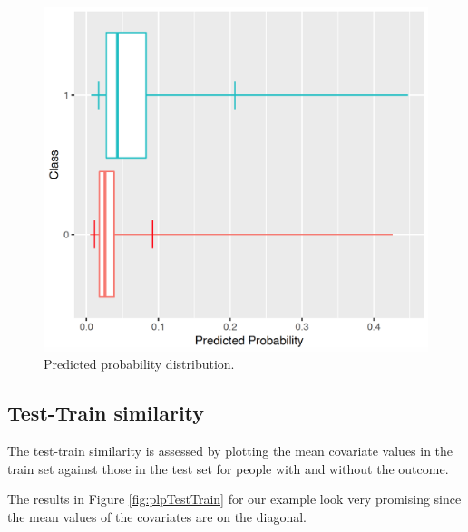\documentclass[11pt]{book}
\begin{document}
\begin{figure}

{\centering \includegraphics[width=0.9\linewidth]{images/PatientLevelPrediction/predictionDistribution} 

}

\caption{Predicted probability distribution.}\label{fig:plpPredProb}
\end{figure}

\subsection{Test-Train similarity}\label{test-train-similarity}

The test-train similarity is assessed by plotting the mean covariate
values in the train set against those in the test set for people with
and without the outcome.

The results in Figure \ref{fig:plpTestTrain} for our example look very
promising since the mean values of the covariates are on the diagonal.
\end{document}

